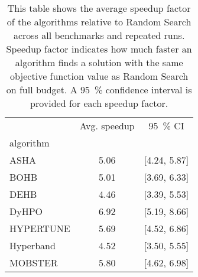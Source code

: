 \begin{table}
\caption{This table shows the average speedup factor of the algorithms relative to Random Search across all benchmarks and repeated runs. Speedup factor indicates how much faster an algorithm finds a solution with the same objective function value as Random Search on full budget. A \SI{95}{\percent} confidence interval is provided for each speedup factor.}
\label{tab:speedup}
\begin{tabular}{lcc}
\toprule
 & Avg. speedup & \SI{95}{\percent} CI \\
algorithm &  &  \\
\midrule
ASHA & 5.06 & [4.24, 5.87] \\
BOHB & 5.01 & [3.69, 6.33] \\
DEHB & 4.46 & [3.39, 5.53] \\
DyHPO & 6.92 & [5.19, 8.66] \\
HYPERTUNE & 5.69 & [4.52, 6.86] \\
Hyperband & 4.52 & [3.50, 5.55] \\
MOBSTER & 5.80 & [4.62, 6.98] \\
\bottomrule
\end{tabular}
\end{table}
